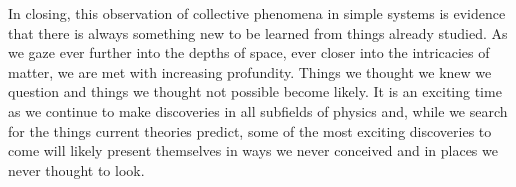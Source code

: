 In closing, this observation of collective phenomena in simple systems is evidence that there is always something new to be learned from things already studied. As we gaze ever further into the depths of space, ever closer into the intricacies of matter, we are met with increasing profundity. Things we thought we knew we question and things we thought not possible become likely. It is an exciting time as we continue to make discoveries in all subfields of physics and, while we search for the things current theories predict, some of the most exciting discoveries to come will likely present themselves in ways we never conceived and in places we never thought to look. 

\pagebreak
\pagebreak


